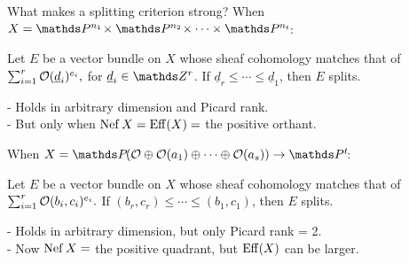 \documentclass[beamer]{paper}
\begin{document}




\begin{frame}[t]{What makes a splitting criterion strong?}
  When $X = \PP{n_1}\times\PP{n_2}\times\cdots\times\PP{n_t}$:
  \begin{theorem}
    Let $E$ be a vector bundle on $X$ whose sheaf cohomology matches that of
    \( \sum_{i=1}^r \mathcal{O}(\underline{d}_i)^{e_i}, \) for $\underline{d}_i\in\ZZ^r$.
    {\color{rossred}If $\underline{d}_r \le \cdots \le \underline{d}_1$}, then $E$ splits.
  \end{theorem}
  \pause
  - Holds in arbitrary dimension and Picard rank. \\
  - But {\color{rossred}only when $\operatorname{Nef}X = \operatorname{Eff}(X) = $ the positive orthant}.

  \vfill
  \pause
  When $X = \PP{}(\o\oplus\o(a_1)\oplus\cdots\oplus\o(a_s)) \to \PP{t}$:
  \pause
  \begin{theorem}[Brown--S. '22]
    Let $E$ be a vector bundle on $X$ whose sheaf cohomology matches that of
    \( \sum_{i=1}^r \mathcal{O}(b_i, c_i)^{e_i}. \)
    {\color{rossred}If $(b_r, c_r) \le \cdots \le(b_1, c_1)$}, then $E$ splits.
  \end{theorem}
  \pause
  - Holds in arbitrary dimension, but {\color{rossred}only Picard rank = 2}. \\
  - Now $\operatorname{Nef}X = $ the positive quadrant, but {\color{rossgreen}$\operatorname{Eff}(X)$ can be larger}.
\end{frame}
\end{document}
